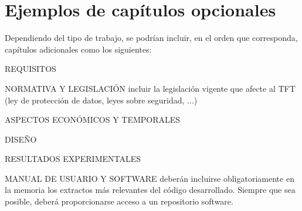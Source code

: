 \section{Ejemplos de capítulos opcionales}

Dependiendo del tipo de trabajo, se podrían incluir, en el orden que corresponda, capítulos adicionales como los siguientes:

\begin{description}
\item{REQUISITOS}
\item{NORMATIVA Y LEGISLACIÓN} incluir la legislación vigente que afecte al TFT (ley de protección de datos, leyes sobre seguridad, ...)
\item{ASPECTOS ECONÓMICOS Y TEMPORALES}
\item{DISEÑO}
\item{RESULTADOS EXPERIMENTALES}
\item{MANUAL  DE  USUARIO  Y  SOFTWARE}  deberán  incluirse  obligatoriamente  en  la  memoria  los extractos más relevantes   del código desarrollado. Siempre que sea posible, deberá   proporcionarse acceso a un repositorio software.
\end{description}

